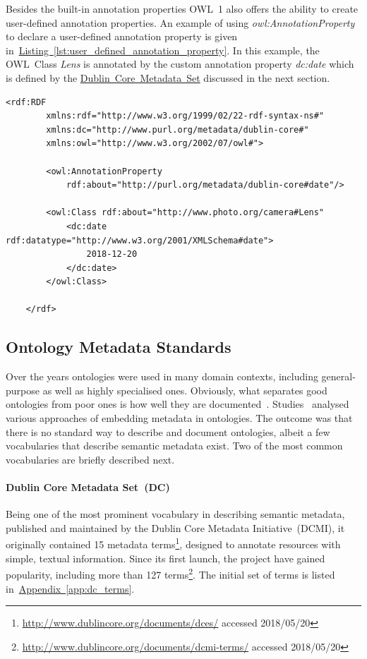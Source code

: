 Besides the built-in annotation properties OWL~1 also offers the ability to create user-defined annotation properties. An example of using \emph{owl:AnnotationProperty} to declare a user-defined annotation property is given in~\hyperref[lst:user_defined_annotation_property]{Listing~\ref*{lst:user_defined_annotation_property}}. In this example, the OWL~Class \emph{Lens} is annotated by the custom annotation property \emph{dc:date} which is defined by the \hyperref[sec:dublin_core_metadata_vocabulary]{Dublin~Core~Metadata~Set} discussed in the next section. 
\begin{lstlisting}[frame=single,caption=Declaration of user-defined annotation property in OWL~1,label=lst:user_defined_annotation_property]
	<rdf:RDF
		xmlns:rdf="http://www.w3.org/1999/02/22-rdf-syntax-ns#"
		xmlns:dc="http://www.purl.org/metadata/dublin-core#"
		xmlns:owl="http://www.w3.org/2002/07/owl#">
		
		<owl:AnnotationProperty 
			rdf:about="http://purl.org/metadata/dublin-core#date"/>
		
		<owl:Class rdf:about="http://www.photo.org/camera#Lens"
			<dc:date rdf:datatype="http://www.w3.org/2001/XMLSchema#date">
				2018-12-20
			</dc:date>
		</owl:Class>
		
	</rdf>
\end{lstlisting}

\subsection{Ontology Metadata Standards}\label{sec:ontology_metadata_standards}
Over the years ontologies were used in many domain contexts, including general-purpose as well as highly specialised ones. Obviously, what separates good ontologies from poor ones is how well they are documented~\cite{daquin2012}. Studies~\cite{dutta2017} analysed various approaches of embedding metadata in ontologies. The outcome was that there is no standard way to describe and document ontologies, albeit a few vocabularies that describe semantic metadata exist. Two of the most common vocabularies are briefly described next.

\paragraph{Dublin Core Metadata Set~(DC)}\label{sec:dublin_core_metadata_vocabulary} Being one of the most prominent vocabulary in describing semantic metadata, published and maintained by the Dublin Core Metadata Initiative~(DCMI), it originally contained 15 metadata terms\footnote{\url{http://www.dublincore.org/documents/dces/} accessed 2018/05/20},  designed to annotate resources with simple, textual information. Since its first launch, the project have gained popularity, including more than 127 terms\footnote{\url{http://www.dublincore.org/documents/dcmi-terms/} accessed 2018/05/20}. The initial set of terms is listed in~\hyperref[app:dc_terms]{Appendix~\ref*{app:dc_terms}}. 

